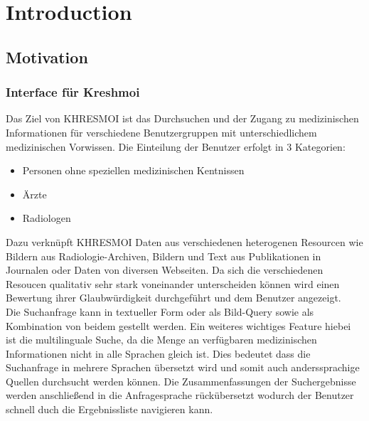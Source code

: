 \section{Introduction}
\label{sec:introduction}

\subsection{Motivation}
\label{sec:Motivation}

\subsubsection{Interface für Kreshmoi}
\label{sec:Interface für Kreshmoi}
Das Ziel von KHRESMOI ist das Durchsuchen und der Zugang zu medizinischen Informationen für verschiedene Benutzergruppen mit unterschiedlichem medizinischen Vorwissen.
Die Einteilung der Benutzer erfolgt in 3 Kategorien:
\begin{itemize}
	\item Personen ohne speziellen medizinischen Kentnissen
	\item Ärzte
	\item Radiologen
\end{itemize}
Dazu verknüpft KHRESMOI Daten aus verschiedenen heterogenen Resourcen wie Bildern aus Radiologie-Archiven, Bildern und Text aus Publikationen in Journalen oder Daten von diversen Webseiten.
Da sich die verschiedenen Resoucen qualitativ sehr stark voneinander unterscheiden können wird einen Bewertung ihrer Glaubwürdigkeit durchgeführt und dem Benutzer angezeigt.
\\
Die Suchanfrage kann in textueller Form oder als Bild-Query sowie als Kombination von beidem gestellt werden.
Ein weiteres wichtiges Feature hiebei ist die multilinguale Suche, da die Menge an verfügbaren medizinischen Informationen nicht in alle Sprachen gleich ist.
Dies bedeutet dass die Suchanfrage in mehrere Sprachen übersetzt wird und somit auch anderssprachige Quellen durchsucht werden können.
Die Zusammenfassungen der Suchergebnisse werden anschließend in die Anfragesprache rückübersetzt wodurch der Benutzer schnell duch die Ergebnissliste navigieren kann.
\cite{kres}

